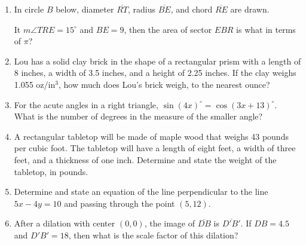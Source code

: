 \documentclass[12pt, oneside]{article}
\begin{document}
\begin{enumerate}[itemsep=2cm]
\item In circle $B$ below, diameter $\overline{RT}$, radius $\overline{BE}$, and chord $\overline{RE}$ are drawn.
\begin{center}
  \end{center}
  It $m\angle TRE = 15^\circ$ and $BE=9$, then the area of sector $EBR$ is what in terms of $\pi$?

\item Lou has a solid clay brick in the shape of a rectangular prism with a length of 8 inches, a width of 3.5 inches, and a height of 2.25 inches. If the clay weighs 1.055 oz/in$^3$, how much does Lou's brick weigh, to the nearest ounce? 

\item For the acute angles in a right triangle, $\sin (4x)^\circ =\cos (3x +13)^\circ$. \\
What is the number of degrees in the measure of the smaller angle?

\item A rectangular tabletop will be made of maple wood that weighs 43 pounds per cubic foot. The tabletop will have a length of eight feet, a width of three feet, and a thickness of one inch. Determine and state the weight of the tabletop, in pounds.

\item Determine and state an equation of the line perpendicular to the line\\ $5x-4y=10$ and passing through the point $(5,12)$.

\newpage
\item After a dilation with center $(0,0)$, the image of $\overline{DB}$ is $\overline{D'B'}$. If $DB=4.5$ and $D'B'=18$, then what is the scale factor of this dilation?


\end{enumerate}
\end{document}
